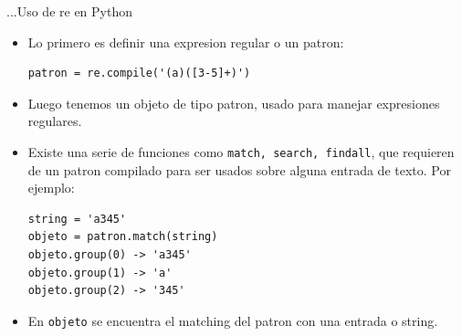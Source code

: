\documentclass{beamer}
\begin{document}
\begin{frame}[fragile]{...Uso de re en Python}
	\begin{itemize}
    \item Lo primero es definir una expresion regular o un patron:
\begin{lstlisting}
patron = re.compile('(a)([3-5]+)')
\end{lstlisting}
	\item Luego tenemos un objeto de tipo patron, usado para manejar expresiones regulares.
    \item Existe una serie de funciones como \texttt{match, search, findall}, que requieren de un patron compilado para ser usados sobre alguna entrada de texto. Por ejemplo:
\begin{lstlisting}
string = 'a345'
objeto = patron.match(string)
objeto.group(0) -> 'a345'
objeto.group(1) -> 'a'
objeto.group(2) -> '345'
\end{lstlisting}
	\item En \texttt{objeto} se encuentra el matching del patron con una entrada o string.
	\end{itemize}
	
\end{frame}
    
    
\end{document}
